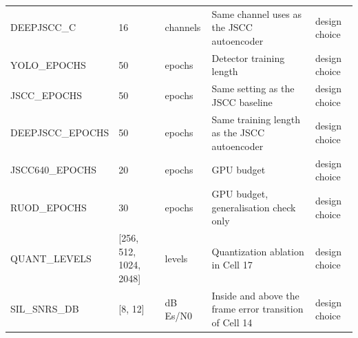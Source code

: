 \begin{table}[t]
\begin{tabular}{p{3.3cm}p{2.6cm}p{1.6cm}p{6.6cm}p{2.0cm}}
DEEPJSCC\_C & 16 & channels & Same channel uses as the JSCC autoencoder & design choice \\
YOLO\_EPOCHS & 50 & epochs & Detector training length & design choice \\
JSCC\_EPOCHS & 50 & epochs & Same setting as the JSCC baseline & design choice \\
DEEPJSCC\_EPOCHS & 50 & epochs & Same training length as the JSCC autoencoder & design choice \\
JSCC640\_EPOCHS & 20 & epochs & GPU budget & design choice \\
RUOD\_EPOCHS & 30 & epochs & GPU budget, generalisation check only & design choice \\
QUANT\_LEVELS & [256, 512, 1024, 2048] & levels & Quantization ablation in Cell 17 & design choice \\
SIL\_SNRS\_DB & [8, 12] & dB Es/N0 & Inside and above the frame error transition of Cell 14 & design choice \\
\hline
\end{tabular}
\end{table}
